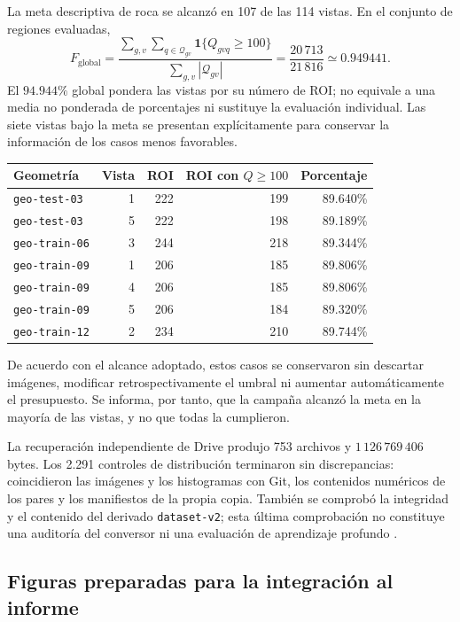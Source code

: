 \documentclass[11pt,a4paper]{article}
\newcommand{\ind}{\mathbf{1}}
\begin{document}
La meta descriptiva de roca se alcanzó en 107 de las 114 vistas. En el conjunto de regiones evaluadas,
\begin{equation}
 F_{\mathrm{global}}=
 \frac{\sum_{g,v}\sum_{q\in\mathcal Q_{gv}}\ind\{Q_{gvq}\geq100\}}
 {\sum_{g,v}|\mathcal Q_{gv}|}
 =\frac{20\,713}{21\,816}\simeq0.949441.
\end{equation}
El $94.944\%$ global pondera las vistas por su número de ROI; no equivale a una media no ponderada de porcentajes ni sustituye la evaluación individual. Las siete vistas bajo la meta se presentan explícitamente para conservar la información de los casos menos favorables.

\begin{center}
\begin{tabular}{lrrrr}
\toprule Geometría & Vista & ROI & ROI con $Q\geq100$ & Porcentaje\\\midrule
\texttt{geo-test-03}&1&222&199&89.640\%\\
\texttt{geo-test-03}&5&222&198&89.189\%\\
\texttt{geo-train-06}&3&244&218&89.344\%\\
\texttt{geo-train-09}&1&206&185&89.806\%\\
\texttt{geo-train-09}&4&206&185&89.806\%\\
\texttt{geo-train-09}&5&206&184&89.320\%\\
\texttt{geo-train-12}&2&234&210&89.744\%\\\bottomrule
\end{tabular}
\end{center}

De acuerdo con el alcance adoptado, estos casos se conservaron sin descartar imágenes, modificar retrospectivamente el umbral ni aumentar automáticamente el presupuesto. Se informa, por tanto, que la campaña alcanzó la meta en la mayoría de las vistas, y no que todas la cumplieron.

La recuperación independiente de Drive produjo 753 archivos y $1\,126\,769\,406$ bytes. Los 2.291 controles de distribución terminaron sin discrepancias: coincidieron las imágenes y los histogramas con Git, los contenidos numéricos de los pares y los manifiestos de la propia copia. También se comprobó la integridad y el contenido del derivado \texttt{dataset-v2}; esta última comprobación no constituye una auditoría del conversor ni una evaluación de aprendizaje profundo \cite{drive}.

\subsection{Figuras preparadas para la integración al informe}
\end{document}
